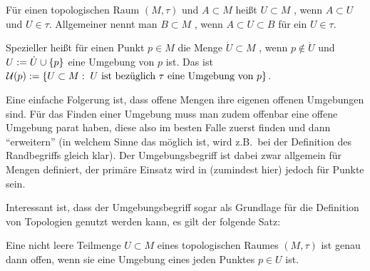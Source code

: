 \documentclass[../H_Analysis_main.tex]{subfiles}
\begin{document}
\begin{defi}[Umgebung]
Für einen topologischen Raum $(M, \tau)$ und $A \subset M$ heißt $U \subset M$ , wenn $A \subset U$ und $U \in \tau$. Allgemeiner nennt man $B \subset M$ , wenn $A \subset U \subset B$ für ein $U \in \tau$.

Spezieller heißt für einen Punkt $p \in M$ die Menge $\dot{U} \subset M$ , wenn $p \notin \dot{U}$ und $U := \dot{U} \cup \qty{p}$ eine Umgebung von $p$ ist. Das  ist $\mathcal{U}(p) := \qty{U \subset M: \; U \text{ ist bezüglich } \tau \text{ eine Umgebung von } p}$.
\end{defi}

Eine einfache Folgerung ist, dass offene Mengen ihre eigenen offenen Umgebungen sind. Für das Finden einer Umgebung muss man zudem offenbar eine offene Umgebung parat haben, diese also im besten Falle zuerst finden und dann \enquote{erweitern} (in welchem Sinne das möglich ist, wird z.B.~bei der Definition des Randbegriffs gleich klar). Der Umgebungsbegriff ist dabei zwar allgemein für Mengen definiert, der primäre Einsatz wird in (zumindest hier) jedoch für Punkte sein.

Interessant ist, dass der Umgebungsbegriff sogar als Grundlage für die Definition von Topologien genutzt werden kann, es gilt der folgende Satz:
\begin{satz}
Eine nicht leere Teilmenge $U \subset M$ eines topologischen Raumes $(M, \tau)$ ist genau dann offen, wenn sie eine Umgebung eines jeden Punktes $p \in U$ ist.
\end{satz}
\end{document}

